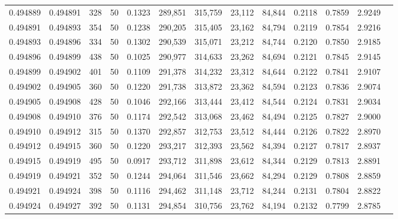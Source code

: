 \begin{tabular}{rrrrrrrrrrrrr}
0.494889 & 0.494891 &   328 &  50 &                                     0.1323 & 289,851 & 315,759 &  23,112 &  84,844 & 0.2118 & 0.7859 & 2.9249 \\
0.494891 & 0.494893 &   354 &  50 &                                     0.1238 & 290,205 & 315,405 &  23,162 &  84,794 & 0.2119 & 0.7854 & 2.9216 \\
0.494893 & 0.494896 &   334 &  50 &                                     0.1302 & 290,539 & 315,071 &  23,212 &  84,744 & 0.2120 & 0.7850 & 2.9185 \\
0.494896 & 0.494899 &   438 &  50 &                                     0.1025 & 290,977 & 314,633 &  23,262 &  84,694 & 0.2121 & 0.7845 & 2.9145 \\
0.494899 & 0.494902 &   401 &  50 &                                     0.1109 & 291,378 & 314,232 &  23,312 &  84,644 & 0.2122 & 0.7841 & 2.9107 \\
0.494902 & 0.494905 &   360 &  50 &                                     0.1220 & 291,738 & 313,872 &  23,362 &  84,594 & 0.2123 & 0.7836 & 2.9074 \\
0.494905 & 0.494908 &   428 &  50 &                                     0.1046 & 292,166 & 313,444 &  23,412 &  84,544 & 0.2124 & 0.7831 & 2.9034 \\
0.494908 & 0.494910 &   376 &  50 &                                     0.1174 & 292,542 & 313,068 &  23,462 &  84,494 & 0.2125 & 0.7827 & 2.9000 \\
0.494910 & 0.494912 &   315 &  50 &                                     0.1370 & 292,857 & 312,753 &  23,512 &  84,444 & 0.2126 & 0.7822 & 2.8970 \\
0.494912 & 0.494915 &   360 &  50 &                                     0.1220 & 293,217 & 312,393 &  23,562 &  84,394 & 0.2127 & 0.7817 & 2.8937 \\
0.494915 & 0.494919 &   495 &  50 &                                     0.0917 & 293,712 & 311,898 &  23,612 &  84,344 & 0.2129 & 0.7813 & 2.8891 \\
0.494919 & 0.494921 &   352 &  50 &                                     0.1244 & 294,064 & 311,546 &  23,662 &  84,294 & 0.2129 & 0.7808 & 2.8859 \\
0.494921 & 0.494924 &   398 &  50 &                                     0.1116 & 294,462 & 311,148 &  23,712 &  84,244 & 0.2131 & 0.7804 & 2.8822 \\
0.494924 & 0.494927 &   392 &  50 &                                     0.1131 & 294,854 & 310,756 &  23,762 &  84,194 & 0.2132 & 0.7799 & 2.8785 \\

\end{tabular}
